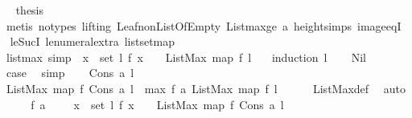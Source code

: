 \begin{isabellebody}
\ \isamarkupfalse%
\ {\isacharquery}thesis\isanewline
\ \ \ \ \ \ \isamarkupfalse%
\ {\isacharparenleft}metis\ {\isacharparenleft}no{\isacharunderscore}types{\isacharcomma}\ lifting{\isacharparenright}\ Leaf{\isacharunderscore}non{\isacharunderscore}ListOfEmpty\ Listmax{\isacharunderscore}ge\ a{}\ height{\isachardot}simps{\isacharparenleft}{}{\isacharparenright}\ image{\isacharunderscore}eqI\ \isanewline
le{\isacharunderscore}SucI\ le{\isacharunderscore}numeral{\isacharunderscore}extra{\isacharparenleft}{}{\isacharparenright}\ list{\isachardot}set{\isacharunderscore}map{\isacharparenright}\ \isanewline
\ \ \isamarkupfalse%
\isanewline
{}\isamarkupfalse%
%
\endisatagproof
{\isafoldproof}%
%
\isadelimproof
\isanewline
%
\endisadelimproof
\isanewline
{}\isamarkupfalse%
\ listmax{\isacharunderscore}{}\ {\isacharbrackleft}simp{\isacharbrackright}{\isacharcolon}\ {\isachardoublequoteopen}{\isacharparenleft}{\isasymforall}\ x\ {\isasymin}\ set\ l{\isachardot}\ f\ x\ {\isacharequal}\ {}{\isacharparenright}\ {\isasymlongrightarrow}\ ListMax\ {\isacharparenleft}map\ f\ l{\isacharparenright}\ {\isacharequal}\ {}{\isachardoublequoteclose}\isanewline
%
\isadelimproof
%
\endisadelimproof
%
\isatagproof
{}\isamarkupfalse%
\ {\isacharparenleft}induction\ l{\isacharparenright}\isanewline
\ \ \isamarkupfalse%
\ Nil\isanewline
\ \ \isamarkupfalse%
\ \isamarkupfalse%
\ {\isacharquery}case\ \isamarkupfalse%
\ simp\isanewline
{}\isamarkupfalse%
\isanewline
\ \ \isamarkupfalse%
\ {\isacharparenleft}Cons\ a\ l{\isacharparenright}\isanewline
\ \ \isamarkupfalse%
\ {\isachardoublequoteopen}ListMax\ {\isacharparenleft}map\ f\ {\isacharparenleft}Cons\ a\ l{\isacharparenright}{\isacharparenright}\ {\isacharequal}\ max\ {\isacharparenleft}f\ a{\isacharparenright}\ {\isacharparenleft}ListMax\ {\isacharparenleft}map\ f\ l{\isacharparenright}{\isacharparenright}{\isachardoublequoteclose}\isanewline
\ \ \ \ \isamarkupfalse%
\ ListMax{\isacharunderscore}def\ \isamarkupfalse%
\ auto\isanewline
\ \ \isamarkupfalse%
\ \isamarkupfalse%
\ {\isachardoublequoteopen}{\isacharparenleft}f\ a\ {\isacharequal}\ {}{\isacharparenright}\ {\isasymand}\ {\isacharparenleft}{\isasymforall}\ x\ {\isasymin}\ set\ l{\isachardot}\ f\ x\ {\isacharequal}\ {}{\isacharparenright}\ {\isasymlongrightarrow}\ ListMax\ {\isacharparenleft}map\ f\ {\isacharparenleft}Cons\ a\ l{\isacharparenright}{\isacharparenright}\ \ {\isacharequal}\ {}{\isachardoublequoteclose}\isanewline

\end{isabellebody}
